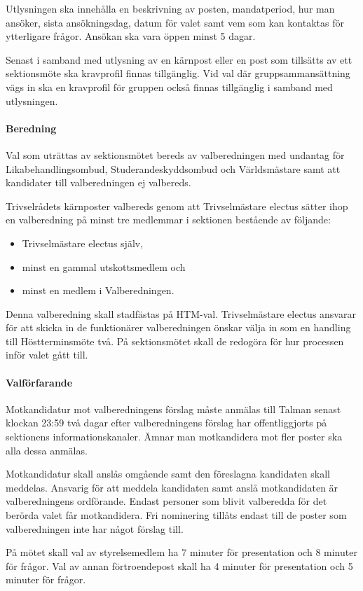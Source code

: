 \documentclass{dsekpolicy}
\begin{document}
Utlysningen ska innehålla en beskrivning av posten, mandatperiod, hur man
ansöker, sista ansökningsdag, datum för valet samt vem som kan kontaktas för
ytterligare frågor. Ansökan ska vara öppen minst 5 dagar.

Senast i samband med utlysning av en kärnpost eller en post som tillsätts av ett
sektionsmöte ska kravprofil finnas tillgänglig. Vid val där gruppsammansättning
vägs in ska en kravprofil för gruppen också finnas tillgänglig i samband med
utlysningen.

\paragraph{Beredning}
Val som uträttas av sektionsmötet bereds av valberedningen med undantag för
Likabehandlingsombud, Studerandeskyddsombud och Världsmästare samt att
kandidater till valberedningen ej valbereds.

Trivselrådets kärnposter valbereds genom att Trivselmästare electus sätter ihop
en valberedning på minst tre medlemmar i sektionen bestående av följande:
\begin{itemize}
\item Trivselmästare electus själv,
\item minst en gammal utskottsmedlem och
\item minst en medlem i Valberedningen.
\end{itemize}

Denna valberedning skall stadfästas på HTM-val. Trivselmästare electus ansvarar
för att skicka in de funktionärer valberedningen önskar välja in som en handling
till Höstterminsmöte två. På sektionsmötet skall de redogöra för hur processen
inför valet gått till.

\paragraph{Valförfarande}
Motkandidatur mot valberedningens förslag måste anmälas till Talman senast
klockan 23:59 två dagar efter valberedningens förslag har offentliggjorts på
sektionens informationskanaler. Ämnar man motkandidera mot fler poster ska alla
dessa anmälas.

Motkandidatur skall anslås omgående samt den föreslagna kandidaten skall
meddelas. Ansvarig för att meddela kandidaten samt anslå motkandidaten är
valberedningens ordförande. Endast personer som blivit valberedda för det
berörda valet får motkandidera.  Fri nominering tillåts endast till de poster
som valberedningen inte har något förslag till.

På mötet skall val av styrelsemedlem ha 7 minuter för presentation och 8 minuter
för frågor. Val av annan förtroendepost skall ha 4 minuter för presentation och
5 minuter för frågor.
\end{document}
